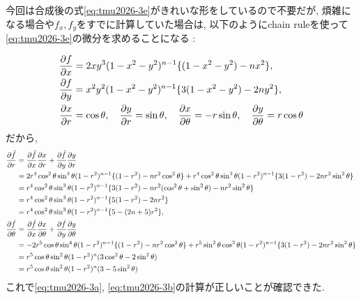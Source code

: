 \documentclass[titlepage]{jsarticle}
\numberwithin{equation}{section}
\begin{document}
\begin{marker}
今回は合成後の式\eqref{eq:tmu2026-3e}がきれいな形をしているので不要だが, 煩雑になる場合や$f_x, f_y$をすでに計算していた場合は, 以下のようにchain ruleを使って\eqref{eq:tmu2026-3e}の微分を求めることになる : 
\end{marker}
\begin{align}
\dfrac{\partial f}{\partial x} &= 2xy^3(1-x^2 - y^2)^{n-1}\{(1- x^2 - y^2) - nx^2\},\label{eq:tmu2026-3l}\\
\dfrac{\partial f}{\partial y} &= x^2y^2(1 - x^2 - y^2)^{n-1}\{3(1 - x^2 - y^2) - 2ny^2\},\label{eq:tmu2026-3m}\\
\dfrac{\partial x}{\partial r} &= \cos\theta, \quad \dfrac{\partial y}{\partial r} = \sin\theta,\quad \dfrac{\partial x}{\partial \theta} = -r\sin\theta, \quad \dfrac{\partial y}{\partial \theta} = r\cos\theta \notag
\end{align}
だから,
\begin{align*}
\dfrac{\partial \tilde{f}}{\partial r} &= \dfrac{\partial \tilde{f}}{\partial x}\dfrac{\partial x}{\partial r} + \dfrac{\partial \tilde{f}}{\partial y}\dfrac{\partial y}{\partial r}\notag\\
&= 2r^4\cos^2\theta\sin^3\theta(1-r^2)^{n-1}\{(1-r^2) - nr^2\cos^2\theta\} + r^4\cos^2\theta\sin^3\theta(1-r^2)^{n-1}\{3(1-r^2) - 2nr^2\sin^2\theta\}\notag\\
&= r^4\cos^2\theta\sin^3\theta(1-r^2)^{n-1}\{3(1 - r^2) - nr^2(\cos^2\theta + \sin^2\theta) - nr^2\sin^2\theta\}\notag\\
&= r^4\cos^2\theta\sin^3\theta(1-r^2)^{n-1}\{5(1 - r^2) - 2nr^2\} \notag\\
&= r^4\cos^2\theta\sin^3\theta(1-r^2)^{n-1}\{5 - (2n+5)r^2\},\\ 
\dfrac{\partial \tilde{f}}{\partial \theta} &= \dfrac{\partial \tilde{f}}{\partial x}\dfrac{\partial x}{\partial \theta} + \dfrac{\partial \tilde{f}}{\partial y}\dfrac{\partial y}{\partial \theta}\notag\\
& = -2r^5\cos\theta\sin^4\theta(1 - r^2)^{n-1}\{(1 - r^2) - nr^2\cos^2\theta\} + r^5\sin^2\theta\cos^3\theta(1 - r^2)^{n-1}\{3(1 - r^2) - 2nr^2\sin^2\theta\}\notag\\
&= r^5\cos\theta\sin^2\theta(1 - r^2)^n(3\cos^2\theta-2\sin^2\theta) \notag\\
&= r^5\cos\theta\sin^2\theta(1 - r^2)^{n}(3 - 5\sin^2\theta)
\end{align*}
これで\eqref{eq:tmu2026-3a}, \eqref{eq:tmu2026-3b}の計算が正しいことが確認できた. 
\end{document}
